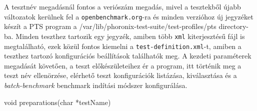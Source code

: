 A tesztnév megadásnál fontos a veriószám megadás, mivel a tesztekből újabb változatok kerülnek fel a \texttt{openbenchmark.org}-ra és minden verzióhoz új jegyzéket készít a PTS program a /var/lib/phoronix-test-suite/test-profiles/pts directory-ba.
Minden teszthez tartozik egy jegyzék, amiben több \texttt{xml} kiterjesztésű fájl is megtalálható, ezek közül fontos kiemelni a \texttt{test-definition.xml}-t, amiben a teszthez tartozó konfigurációs beállítások találhatók meg.
A kezdeti paraméterek megadását követően, a teszt előkészületeihez ér a program, itt történik meg a teszt név ellenörzése, elérhető teszt konfigurációk listázása, kiválasztása és a \textit{batch-benchmark} benchmark indítási módszer konfigurálása. 

\begin{cpp}
void preparations(char *testName)
\end{cpp}

